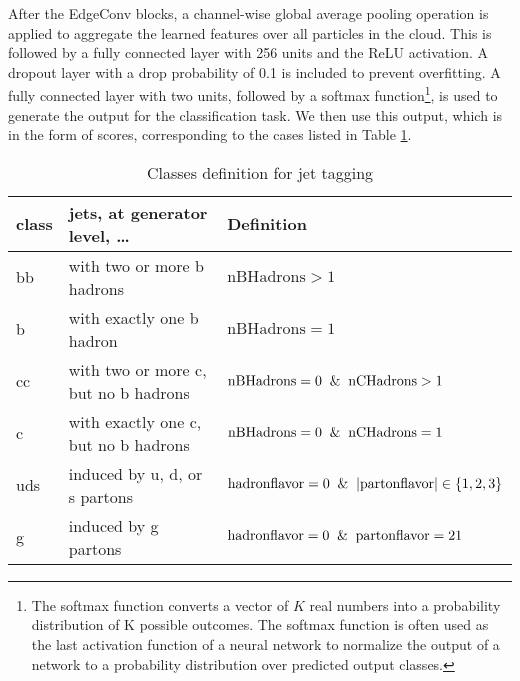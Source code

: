 \indent After the EdgeConv blocks, a channel-wise global average pooling operation is applied to aggregate the learned features over all particles in the cloud. This is followed by a fully connected layer with 256 units and the ReLU activation. A dropout layer with a drop probability of 0.1 is included to prevent overfitting. A fully connected layer with two units, followed by a softmax function\footnote{The softmax function converts a vector of $K$ real numbers into a probability distribution of K possible outcomes. The softmax function is often used as the last activation function of a neural network to normalize the output of a network to a probability distribution over predicted output classes.}, is used to generate the output for the classification task. We then use this output, which is in the form of scores, corresponding to the cases listed in Table \ref{tab:classes}.
\begin{table}[H]
    \caption{Classes definition for jet tagging}
    \label{tab:classes}
	\centering\small
	\begin{tabular}{lll}\hline
		class & jets, at generator level, \dots & Definition\\ \hline
		bb & with two or more b hadrons & \(\mathrm{nBHadrons} > 1\)\\
		 b  & with exactly one b hadron & \(\mathrm{nBHadrons} =  1\)\\
		cc&  with two or more c, but no b hadrons& \(\mathrm{nBHadrons} = 0 \And 
		\mathrm{nCHadrons} > 1\) \\
		c & with exactly one c, but no b hadrons & \(\mathrm{nBHadrons} = 0 \And
		\mathrm{nCHadrons} = 1\)\\
		uds & induced by  u,  d, or s partons & \(\mathrm{hadronflavor} = 0 \And \left|\text{partonflavor}\right| \in \{1, 2, 3\}\)\\
		g & induced by g partons & \(\mathrm{hadronflavor} = 0 \And \mathrm{partonflavor} = 21\)
	\end{tabular}
\end{table}

